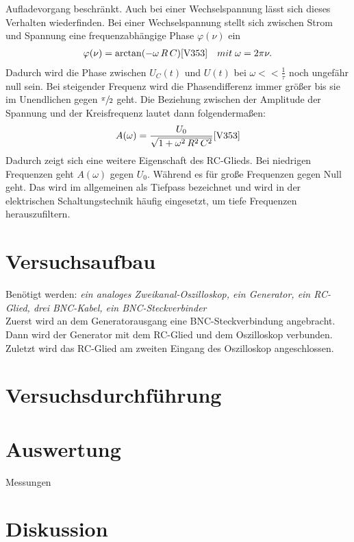   Aufladevorgang beschränkt. Auch bei einer Wechselspannung lässt sich dieses 
  Verhalten wiederfinden. Bei einer Wechselspannung stellt sich zwischen Strom 
  und Spannung eine frequenzabhängige Phase $\varphi(\nu)$ ein
  \begin{align}
      \varphi(\nu)=\arctan (-\omega \, R\, C) \text{\cite{V353}} \quad mit \; \omega = 2 \pi \nu. \label{eq:nu}
  \end{align}
  Dadurch wird die Phase zwischen $U_C(t)$ und $U(t)$ bei $\omega << \frac{1}{\tau}$
  noch ungefähr null sein. Bei steigender Frequenz wird die Phasendifferenz immer größer
  bis sie im Unendlichen gegen $\sfrac{\pi}{2}$ geht.
  Die Beziehung zwischen der Amplitude der Spannung und der Kreisfrequenz lautet dann 
  folgendermaßen:
  \begin{align}
    A(\omega)= \frac{U_0}{\sqrt{1+\omega^2\, R^2\, C^2}} \text{\cite{V353}} \label{eq:A}
  \end{align}
  Dadurch zeigt sich eine weitere Eigenschaft des RC-Glieds. Bei niedrigen 
  Frequenzen geht $A(\omega)$ gegen $U_0$. Während es für große Frequenzen
  gegen Null geht.
  Das wird im allgemeinen als Tiefpass bezeichnet und  wird in der 
  elektrischen Schaltungstechnik häufig eingesetzt, um tiefe Frequenzen
  herauszufiltern.




  


\section{Versuchsaufbau}
Benötigt werden: \textit{ein analoges Zweikanal-Oszilloskop, ein Generator, ein RC-Glied, drei BNC-Kabel, ein BNC-Steckverbinder }\\
Zuerst wird an dem Generatorausgang eine BNC-Steckverbindung angebracht. 
Dann wird der Generator mit dem RC-Glied und dem Oszilloskop verbunden. \\
Zuletzt wird das RC-Glied am zweiten Eingang des Oszilloskop angeschlossen.
\section{Versuchsdurchführung}

\section{Auswertung}

    \begin{table}
        \centering
        \caption{Messungen}
         
        \label{tab:data}
    \end{table}

\section{Diskussion}
\newpage
\nocite{V353}
\printbibliography
